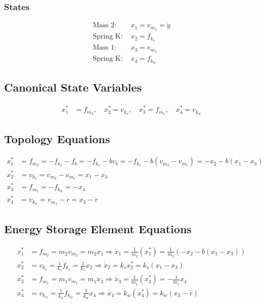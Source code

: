 \documentclass{article}
\begin{document}
\subsubsection{States}
\begin{align*}
\text{Mass 2: } & x_1 = v_{m_2} = \dot{y} \\
\text{Spring K: } & x_2 = f_{k_s} \\
\text{Mass 1: } & x_3 = v_{m_1} \\
\text{Spring K: } & x_4 = f_{k_w}
\end{align*}

\subsection{Canonical State Variables}
\begin{align*}
x^*_1 &= f_{m_2}, \quad x^*_2 = v_{k_s}, \quad x^*_3 = f_{m_1}, \quad x^*_4 = v_{k_w}
\end{align*}

\subsection{Topology Equations}
\begin{align*}
x^*_1 &= f_{m_2} = -f_{k_s} - f_b = -f_{k_s} - bv_b = -f_{k_s} - b(v_{m_2} - v_{m_1}) = -x_2 - b(x_1 - x_3) \\
x^*_2 &= v_{k_s} = v_{m_2} - v_{m_1} = x_1 - x_3 \\
x^*_3 &= f_{m_1} = -f_{k_w} = -x_4 \\
x^*_4 &= v_{k_w} = v_{m_1} - \dot{r} = x_3 - \dot{r}
\end{align*}

\subsection{Energy Storage Element Equations}
\begin{align*}
x^*_1 &= f_{m_2} = m_2 \dot{v}_{m_2} = m_2 \dot{x}_1 \Rightarrow \dot{x}_1 = \frac{1}{m_2} (x_1^*) = \frac{1}{m_2} (-x_2 - b(x_1-x_3)) \\
x^*_2 &= v_{k_s} = \frac{1}{k_s} \dot{f}_{k_s} = \frac{1}{k_s} \dot{x}_2 \Rightarrow \dot{x}_2 = k_s x^*_2 = k_s (x_1 - x_3) \\
x^*_3 &= f_{m_1} = m_1 \dot{v}_{m_1} = m_1 \dot{x}_3 \Rightarrow \dot{x}_3 = \frac{1}{m_1} (x_3^*) = -\frac{1}{m_1} x_4 \\
x^*_4 &= v_{k_w} = \frac{1}{k_w} \dot{f}_{k_w} = \frac{1}{k_w} \dot{x}_4 \Rightarrow \dot{x}_4 = k_w(x^*_4) = k_w (x_3 - \dot{r})
\end{align*}
\end{document}
